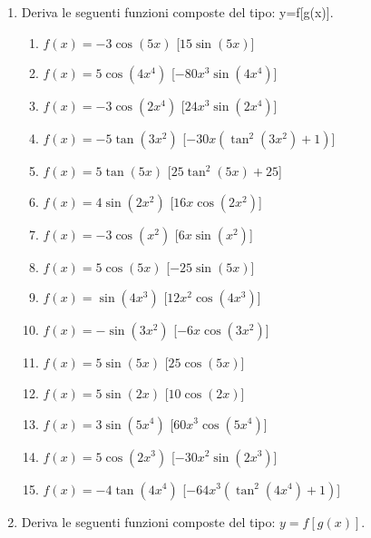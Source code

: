 \begin{enumerate}
\item Deriva le seguenti funzioni composte del tipo: y=f[g(x)].

\begin{enumerate}
\item \(f(x) = - 3 \cos{\left (5 x \right )}\) \hfill [\(15 \sin{\left (5 x 
\right )}\)]
\item \(f(x) = 5 \cos{\left (4 x^{4} \right )}\) \hfill [\(- 80 x^{3} \sin{\left 
(4 x^{4} \right )}\)]
\item \(f(x) = - 3 \cos{\left (2 x^{4} \right )}\) \hfill [\(24 x^{3} \sin{\left 
(2 x^{4} \right )}\)]
\item \(f(x) = - 5 \tan{\left (3 x^{2} \right )}\) \hfill [\(- 30 x 
\left(\tan^{2}{\left (3 x^{2} \right )} + 1\right)\)]
\item \(f(x) = 5 \tan{\left (5 x \right )}\) \hfill [\(25 \tan^{2}{\left (5 x 
\right )} + 25\)]
\item \(f(x) = 4 \sin{\left (2 x^{2} \right )}\) \hfill [\(16 x \cos{\left (2 
x^{2} \right )}\)]
\item \(f(x) = - 3 \cos{\left (x^{2} \right )}\) \hfill [\(6 x \sin{\left (x^{2} 
\right )}\)]
\item \(f(x) = 5 \cos{\left (5 x \right )}\) \hfill [\(- 25 \sin{\left (5 x 
\right )}\)]
\item \(f(x) = \sin{\left (4 x^{3} \right )}\) \hfill [\(12 x^{2} \cos{\left (4 
x^{3} \right )}\)]
\item \(f(x) = - \sin{\left (3 x^{2} \right )}\) \hfill [\(- 6 x \cos{\left (3 
x^{2} \right )}\)]
\item \(f(x) = 5 \sin{\left (5 x \right )}\) \hfill [\(25 \cos{\left (5 x \right 
)}\)]
\item \(f(x) = 5 \sin{\left (2 x \right )}\) \hfill [\(10 \cos{\left (2 x \right 
)}\)]
\item \(f(x) = 3 \sin{\left (5 x^{4} \right )}\) \hfill [\(60 x^{3} \cos{\left 
(5 x^{4} \right )}\)]
\item \(f(x) = 5 \cos{\left (2 x^{3} \right )}\) \hfill [\(- 30 x^{2} \sin{\left 
(2 x^{3} \right )}\)]
\item \(f(x) = - 4 \tan{\left (4 x^{4} \right )}\) \hfill [\(- 64 x^{3} 
\left(\tan^{2}{\left (4 x^{4} \right )} + 1\right)\)]
 \end{enumerate}


\item Deriva le seguenti funzioni composte del tipo: $y=f[g(x)]$.


\end{enumerate}
